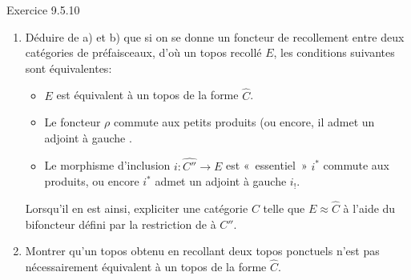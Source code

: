 \documentclass[10pt]{../fichiers-configuration-latex/smfart}
\begin{document}
\begin{enonce*}[remark]{Exercice 9.5.10}
\begin{enumerate}
\item Déduire de a) et b) que si on se donne un foncteur de
recollement  entre deux catégories de
préfaisceaux,
d'où un topos recollé $E$, les conditions suivantes sont
équivalentes:
\begin{itemize}
\item[(i)] $E$ est équivalent à un topos de la forme $\widehat{C}$.

\item[(ii)] Le foncteur $\rho$ commute aux petits produits (ou encore, il
admet un adjoint à gauche .

\item[(iii)] Le morphisme d'inclusion $i:\widehat{C''}\rightarrow E$ est « essentiel »  \ie $i^{\ast}$ commute aux produits, ou encore
$i^{\ast}$ admet un adjoint à gauche $i_{!}$.
\end{itemize}
Lorsqu'il en est ainsi, expliciter une catégorie $C$ telle que
$E\approx \widehat{C}$ à l'aide du bifoncteur 
défini par la restriction de  à $C''$.

\item Montrer qu'un topos obtenu en recollant deux topos ponctuels
n'est pas nécessairement équivalent à un topos de la forme
$\widehat{C}$.
\end{enumerate}
\end{enonce*}
\end{document}
